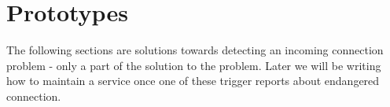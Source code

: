 \chapter{Prototypes}
\label{chap:proto}

The following sections are solutions towards detecting an incoming connection problem - only a part of the solution to the problem. Later we will be writing how to maintain a service once one of these trigger reports about endangered connection.

\newpage
\newpage
\newpage
\newpage


